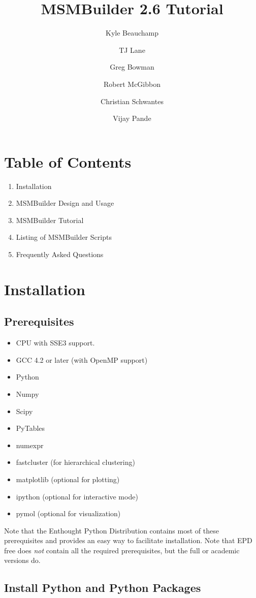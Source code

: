 \documentclass[12pt]{article}
\title
{MSMBuilder 2.6 Tutorial
}
\author{Kyle Beauchamp \and TJ Lane \and Greg Bowman \and  Robert McGibbon \and Christian Schwantes \and Vijay Pande}
\begin{document}
\maketitle

\section{Table of Contents}
\begin{enumerate}
\item Installation
\item MSMBuilder Design and Usage
\item MSMBuilder Tutorial
\item Listing of MSMBuilder Scripts
\item Frequently Asked Questions
\end{enumerate}

\newpage

\section{Installation}

\subsection{Prerequisites}
\begin{itemize}
\item CPU with SSE3 support.
\item GCC 4.2 or later (with OpenMP support)
\item Python
\item Numpy
\item Scipy
\item PyTables
\item numexpr
\item fastcluster (for hierarchical clustering)
\item matplotlib (optional for plotting)
\item ipython (optional for interactive mode)
\item pymol (optional for visualization)
\end{itemize}
Note that the Enthought Python Distribution contains most of these prerequisites and provides an easy way to facilitate installation.  Note that EPD free does \emph{not} contain all the required prerequisites, but the full or academic versions do.  

\subsection{Install Python and Python Packages}
\end{document}
